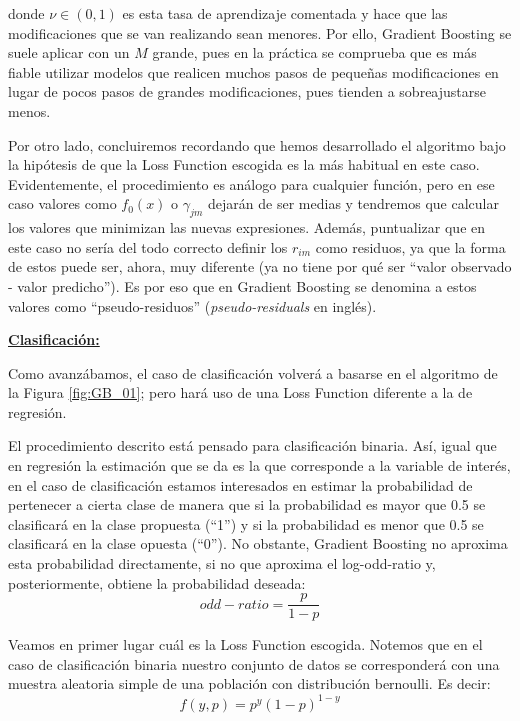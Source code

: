 \documentclass[12pt,twoside]{article}
\begin{document}
\noindent
donde $\nu \in (0, 1)$ es esta tasa de aprendizaje comentada y hace que las modificaciones que se van realizando sean menores. Por ello, Gradient Boosting se suele aplicar con un $M$ grande, pues en la práctica se comprueba que es más fiable utilizar modelos que realicen muchos pasos de pequeñas modificaciones en lugar de pocos pasos de grandes modificaciones, pues tienden a sobreajustarse menos.

Por otro lado, concluiremos recordando que hemos desarrollado el algoritmo bajo la hipótesis de que la Loss Function escogida es la más habitual en este caso. Evidentemente, el procedimiento es análogo para cualquier función, pero en ese caso valores como $f_0(x)$ o $\gamma_{jm}$ dejarán de ser medias y tendremos que calcular los valores que minimizan las nuevas expresiones. Además, puntualizar que en este caso no sería del todo correcto definir los $r_{im}$ como residuos, ya que la forma de estos puede ser, ahora, muy diferente (ya no tiene por qué ser ``valor observado - valor predicho''). Es por eso que en Gradient Boosting se denomina a estos valores como ``pseudo-residuos'' (\textit{pseudo-residuals} en inglés).



\bigskip \bigskip

\textbf{\underline{Clasificación: }}

Como avanzábamos, el caso de clasificación volverá a basarse en el algoritmo de la Figura \ref{fig:GB_01}; pero hará uso de una Loss Function diferente a la de regresión.

El procedimiento descrito está pensado para clasificación binaria. Así, igual que en regresión la estimación que se da es la que corresponde a la variable de interés, en el caso de clasificación estamos interesados en estimar la probabilidad de pertenecer a cierta clase de manera que si la probabilidad es mayor que 0.5 se clasificará en la clase propuesta (``1'') y si la probabilidad es menor que 0.5 se clasificará en la clase opuesta (``0''). No obstante, Gradient Boosting no aproxima esta probabilidad directamente, si no que aproxima el log-odd-ratio y, posteriormente, obtiene la probabilidad deseada:
\begin{equation*}
odd-ratio = \frac{p}{1-p}
\end{equation*}

Veamos en primer lugar cuál es la Loss Function escogida. Notemos que en el caso de clasificación binaria nuestro conjunto de datos se corresponderá con una muestra aleatoria simple de una población con distribución bernoulli. Es decir:
\begin{equation*}
f(y, p) = p^y(1-p)^{1-y}
\end{equation*}
\end{document}
